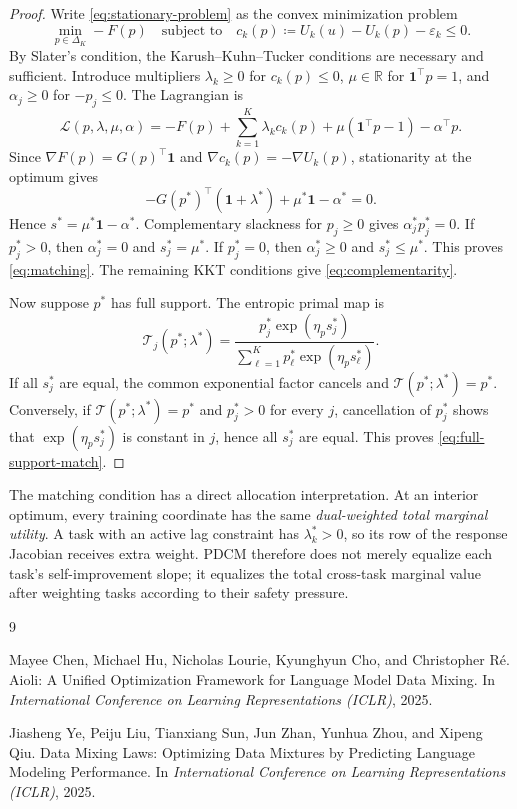 \documentclass[11pt]{article}
\newcommand{\R}{\mathbb{R}}
\newcommand{\DeltaK}{\Delta_K}
\newcommand{\one}{\mathbf{1}}
\begin{document}
\begin{proof}
Write \eqref{eq:stationary-problem} as the convex minimization problem
\[
    \min_{p\in\DeltaK}-F(p)
    \quad\text{subject to}\quad
    c_k(p)\coloneqq U_k(u)-U_k(p)-\varepsilon_k\le0.
\]
By Slater's condition, the Karush--Kuhn--Tucker conditions are necessary and sufficient. Introduce multipliers $\lambda_k\ge0$ for $c_k(p)\le0$, $\mu\in\R$ for $\one^\top p=1$, and $\alpha_j\ge0$ for $-p_j\le0$. The Lagrangian is
\[
    \mathcal L(p,\lambda,\mu,\alpha)
    =
    -F(p)
    +\sum_{k=1}^K\lambda_k c_k(p)
    +\mu(\one^\top p-1)
    -\alpha^\top p.
\]
Since $\nabla F(p)=G(p)^\top\one$ and $\nabla c_k(p)=-\nabla U_k(p)$, stationarity at the optimum gives
\begin{equation}
    -G(p^*)^\top(\one+\lambda^*)
    +\mu^*\one-\alpha^*=0.
    \label{eq:kkt-stat}
\end{equation}
Hence $s^*=\mu^*\one-\alpha^*$. Complementary slackness for $p_j\ge0$ gives $\alpha_j^*p_j^*=0$. If $p_j^*>0$, then $\alpha_j^*=0$ and $s_j^*=\mu^*$. If $p_j^*=0$, then $\alpha_j^*\ge0$ and $s_j^*\le\mu^*$. This proves \eqref{eq:matching}. The remaining KKT conditions give \eqref{eq:complementarity}.

Now suppose $p^*$ has full support. The entropic primal map is
\[
    \mathcal T_j(p^*;\lambda^*)
    =
    \frac{p_j^*\exp(\eta_p s_j^*)}
    {\sum_{\ell=1}^Kp_\ell^*\exp(\eta_p s_\ell^*)}.
\]
If all $s_j^*$ are equal, the common exponential factor cancels and $\mathcal T(p^*;\lambda^*)=p^*$. Conversely, if $\mathcal T(p^*;\lambda^*)=p^*$ and $p_j^*>0$ for every $j$, cancellation of $p_j^*$ shows that $\exp(\eta_ps_j^*)$ is constant in $j$, hence all $s_j^*$ are equal. This proves \eqref{eq:full-support-match}.
\end{proof}

The matching condition has a direct allocation interpretation. At an interior optimum, every training coordinate has the same \emph{dual-weighted total marginal utility}. A task with an active lag constraint has $\lambda_k^*>0$, so its row of the response Jacobian receives extra weight. PDCM therefore does not merely equalize each task's self-improvement slope; it equalizes the total cross-task marginal value after weighting tasks according to their safety pressure.

\begin{thebibliography}{9}

Mayee Chen, Michael Hu, Nicholas Lourie, Kyunghyun Cho, and Christopher R\'e.
\newblock Aioli: A Unified Optimization Framework for Language Model Data Mixing.
\newblock In \emph{International Conference on Learning Representations (ICLR)}, 2025.

Jiasheng Ye, Peiju Liu, Tianxiang Sun, Jun Zhan, Yunhua Zhou, and Xipeng Qiu.
\newblock Data Mixing Laws: Optimizing Data Mixtures by Predicting Language Modeling Performance.
\newblock In \emph{International Conference on Learning Representations (ICLR)}, 2025.

\end{thebibliography}
\end{document}
